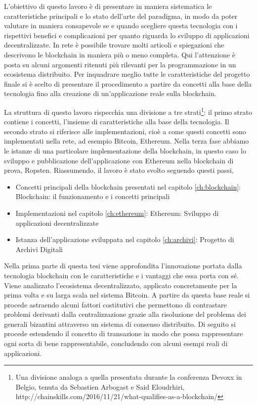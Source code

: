 L’obiettivo di questo lavoro è di presentare in maniera sistematica le caratteristiche principali e lo stato dell’arte del paradigma, in modo da poter valutare in maniera consapevole se e quando scegliere questa tecnologia con i rispettivi benefici e complicazioni per quanto riguarda lo sviluppo di applicazioni decentralizzate. In rete è possibile trovare molti articoli e spiegazioni che descrivono le blockchain in maniera più o meno completa. Qui l’attenzione è posta su alcuni argomenti ritenuti più rilevanti per la programmazione in un ecosistema distribuito. Per inquadrare meglio tutte le caratteristiche del progetto finale si è scelto di presentare il procedimento a partire da concetti alla base della tecnologia fino alla creazione di un'applicazione reale sulla blockchain. 

La struttura di questo lavoro rispecchia una divisione a tre strati\footnote{Una divisione analoga a quella presentata durante la conferenza Devoxx in Belgio, tenuta da Sebastien Arbogast e Said Eloudrhiri, http://chainskills.com/2016/11/21/what-qualifies-as-a-blockchain/}: il primo strato contiene i concetti, l’insieme di caratteristiche alla base della tecnologia. Il secondo strato si riferisce alle implementazioni, cioè a come questi concetti sono implementati nella rete, ad esempio Bitcoin, Ethereum. Nella terza fase abbiamo le istanze di una particolare implementazione della blockchain, in questo caso lo sviluppo e pubblicazione dell’applicazione con Ethereum nella blockchain di prova, Ropsten. Riassumendo, il lavoro è stato svolto seguendo questi passi,

\begin{itemize}
\item Concetti principali della blockchain presentati nel capitolo \ref{ch:blockchain}: Blockchain: il funzionamento e i concetti principali
\item Implementazioni nel capitolo \ref{ch:ethereum}: Ethereum: Sviluppo di applicazioni decentralizzate
\item Istanza dell’applicazione sviluppata nel capitolo \ref{ch:archivi}: Progetto di Archivi Digitali
\end{itemize}

Nella prima parte di questa tesi viene approfondita l’innovazione portata dalla tecnologia blockchain con le caratteristiche e i vantaggi che essa porta con sé. Viene analizzato l’ecosistema decentralizzato, applicato concretamente per la prima volta e su larga scala nel sistema Bitcoin. A partire da questa base reale si procede astraendo alcuni fattori costitutivi che permettono di contrastare problemi derivanti dalla centralizzazione grazie alla risoluzione del problema dei generali bizantini attraverso un sistema di consenso distribuito.
Di seguito si procede estendendo il concetto di transazione in modo che possa rappresentare ogni sorta di bene rappresentabile, concludendo con alcuni esempi reali di applicazioni.

